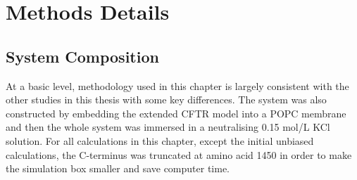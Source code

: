 

\section{Methods Details}
\subsection{System Composition}
At a basic level, methodology used in this chapter is largely consistent with the other studies in this thesis with some key differences. The system was also constructed by embedding the extended CFTR model into a POPC membrane and then the whole system was immersed in a neutralising 0.15 mol/L KCl solution. For all calculations in this chapter, except the initial unbiased calculations, the C-terminus was truncated at amino acid 1450 in order to make the simulation box smaller and save computer time.

